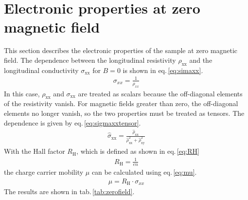 \section{Electronic properties at zero magnetic field}
This section describes the electronic properties of the sample at zero magnetic field.
The dependence between the longitudinal resistivity $\rho_\text{xx}$ and the longitudinal conductivity $\sigma_\text{xx}$ for $B=0$ is shown in eq.\,\ref{eq:simaxx}.
\begin{align}
    \sigma_{xx} = \frac{1}{\rho_{xx}}
    \label{eq:simaxx}
\end{align}
In this case, $\rho_\text{xx}$ and $\sigma_\text{xx}$ are treated as scalars because the off-diagonal elements of the resistivity vanish.
For magnetic fields greater than zero, the off-diagonal elements no longer vanish, so the two properties must be treated as tensors. 
The dependence is given by eq.\,\ref{eq:sigmaxxtensor}.
\begin{align}
    \hat{\sigma}_\text{xx} = \frac{\hat{\rho}_\text{xx}}{\hat{\rho}_\text{xx}^2 + \hat{\rho}_\text{xy}^2}
    \label{eq:sigmaxxtensor}
\end{align}
With the Hall factor $R_\text{H}$, which is defined as shown in eq.\,\ref{eq:RH}
\begin{align}
    R_\text{H}=\frac{1}{en}\label{eq:RH}
\end{align}
the charge carrier mobility $\mu$ can be calculated using eq.\,\ref{eq:mu}.
\begin{align}
    \mu = R_\text{H} \cdot \sigma_{xx}
    \label{eq:mu}
\end{align}
The results are shown in tab.\,\ref{tab:zerofield}.
